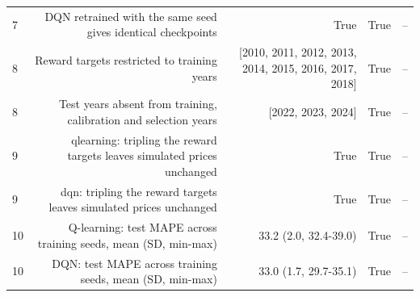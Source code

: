 \begin{tabular}{lrrrr}
7 & DQN retrained with the same seed gives identical checkpoints & True & True & -- \\
8 & Reward targets restricted to training years & [2010, 2011, 2012, 2013, 2014, 2015, 2016, 2017, 2018] & True & -- \\
8 & Test years absent from training, calibration and selection years & [2022, 2023, 2024] & True & -- \\
9 & qlearning: tripling the reward targets leaves simulated prices unchanged & True & True & -- \\
9 & dqn: tripling the reward targets leaves simulated prices unchanged & True & True & -- \\
10 & Q-learning: test MAPE across training seeds, mean (SD, min-max) & 33.2 (2.0, 32.4-39.0) & True & -- \\
10 & DQN: test MAPE across training seeds, mean (SD, min-max) & 33.0 (1.7, 29.7-35.1) & True & -- \\
\bottomrule
\end{tabular}
